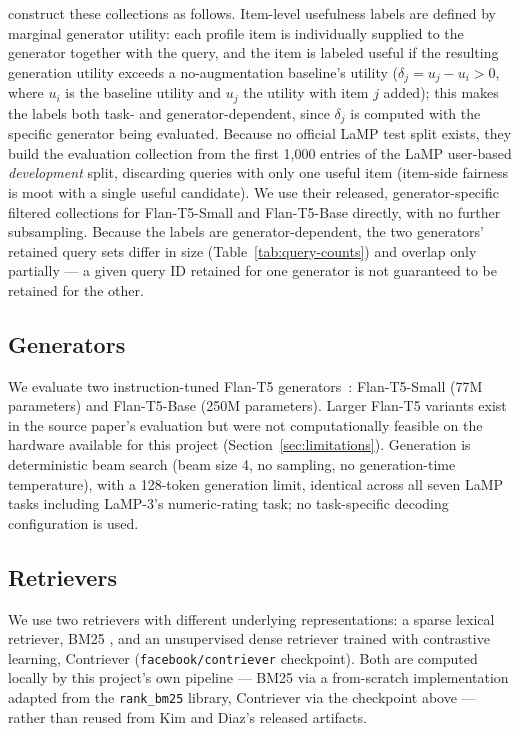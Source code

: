 \documentclass[11pt]{article}
\begin{document}
\citet{kim2025fairrag} construct these collections as follows. Item-level
usefulness labels are defined by marginal generator utility: each profile
item is individually supplied to the generator together with the query,
and the item is labeled useful if the resulting generation utility exceeds
a no-augmentation baseline's utility ($\delta_j = u_j - u_i > 0$, where
$u_i$ is the baseline utility and $u_j$ the utility with item $j$ added);
this makes the labels both task- and generator-dependent, since $\delta_j$
is computed with the specific generator being evaluated. Because no
official LaMP test split exists, they build the evaluation collection from
the first 1{,}000 entries of the LaMP user-based \emph{development} split,
discarding queries with only one useful item (item-side fairness is moot
with a single useful candidate). We use their released, generator-specific
filtered collections for Flan-T5-Small and Flan-T5-Base directly, with no
further subsampling. Because the labels are generator-dependent, the two
generators' retained query sets differ in size (Table~\ref{tab:query-counts})
and overlap only partially --- a given query ID retained for one generator
is not guaranteed to be retained for the other.

\subsection{Generators}

We evaluate two instruction-tuned Flan-T5 generators~\citep{chung2024scaling,raffel2020t5}:
Flan-T5-Small (77M parameters) and Flan-T5-Base (250M parameters). Larger
Flan-T5 variants exist in the source paper's evaluation but were not
computationally feasible on the hardware available for this project
(Section~\ref{sec:limitations}). Generation is deterministic beam search
(beam size 4, no sampling, no generation-time temperature), with a
128-token generation limit, identical across all seven LaMP tasks
including LaMP-3's numeric-rating task; no task-specific decoding
configuration is used.

\subsection{Retrievers}

We use two retrievers with different underlying representations: a
sparse lexical retriever, BM25 \citep{robertson2009bm25}, and an
unsupervised dense retriever trained with contrastive learning,
Contriever \citep{izacard2022contriever} (\texttt{facebook/contriever}
checkpoint). Both are computed locally by this project's own pipeline ---
BM25 via a from-scratch implementation adapted from the \texttt{rank\_bm25}
library, Contriever via the checkpoint above --- rather than reused from
Kim and Diaz's released artifacts.
\end{document}
